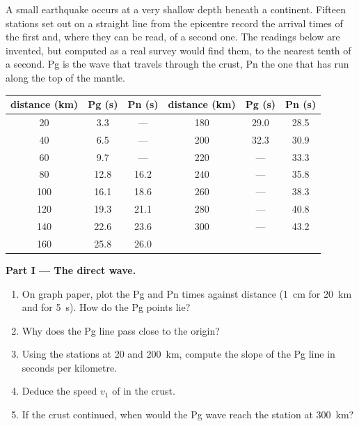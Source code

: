 \begin{problem}
\label{pb:g11:seismic-structure:1}
A small earthquake occurs at a very shallow depth beneath a continent.
Fifteen stations set out on a straight line from the epicentre record the
arrival times of the first  and, where they can be read, of a second
one. The readings below are invented, but computed as a real survey would
find them, to the nearest tenth of a second. Pg is the wave that travels
through the crust, Pn the one that has run along the top of the mantle.

\begin{center}
\small
\begin{tabular}{|c|c|c||c|c|c|}
\hline
distance (\unit{km}) & Pg (\unit{s}) & Pn (\unit{s}) & distance (\unit{km}) & Pg (\unit{s}) & Pn (\unit{s}) \\ \hline
20 & 3.3 & --- & 180 & 29.0 & 28.5 \\ \hline
40 & 6.5 & --- & 200 & 32.3 & 30.9 \\ \hline
60 & 9.7 & --- & 220 & --- & 33.3 \\ \hline
80 & 12.8 & 16.2 & 240 & --- & 35.8 \\ \hline
100 & 16.1 & 18.6 & 260 & --- & 38.3 \\ \hline
120 & 19.3 & 21.1 & 280 & --- & 40.8 \\ \hline
140 & 22.6 & 23.6 & 300 & --- & 43.2 \\ \hline
160 & 25.8 & 26.0 & & & \\ \hline
\end{tabular}
\end{center}

\medskip
\noindent\textbf{Part I --- The direct wave.}
\begin{enumerate}
  \item On graph paper, plot the Pg and Pn times against distance (\qty{1}{cm}
        for \qty{20}{km} and for \qty{5}{s}). How do the Pg points lie?
  \item Why does the Pg line pass close to the origin?
  \item Using the stations at 20 and \qty{200}{km}, compute the slope of the
        Pg line in seconds per kilometre.
  \item Deduce the speed $v_1$ of  in the crust.
  \item If the crust continued, when would the Pg wave reach the station at
        \qty{300}{km}?
\end{enumerate}


\end{problem}
